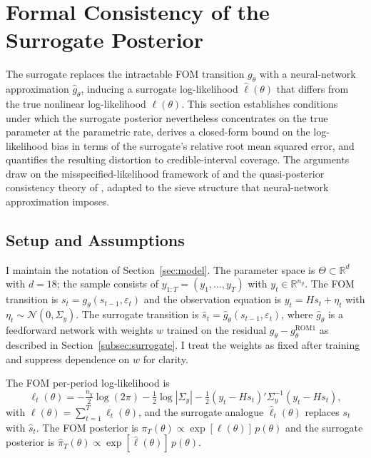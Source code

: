 \documentclass[12pt]{article}
\theoremstyle{plain}
\theoremstyle{definition}
\theoremstyle{remark}
\newcommand{\R}{\mathbb{R}}
\newcommand{\eps}{\varepsilon}
\newcommand{\Sigmay}{\Sigma_y}
\begin{document}
\section{Formal Consistency of the Surrogate Posterior}
\label{sec:formal_consistency}

The surrogate replaces the intractable FOM transition $g_\theta$ with a neural-network approximation $\hat{g}_\theta$, inducing a surrogate log-likelihood $\hat{\ell}(\theta)$ that differs from the true nonlinear log-likelihood $\ell(\theta)$. This section establishes conditions under which the surrogate posterior nevertheless concentrates on the true parameter at the parametric rate, derives a closed-form bound on the log-likelihood bias in terms of the surrogate's relative root mean squared error, and quantifies the resulting distortion to credible-interval coverage. The arguments draw on the misspecified-likelihood framework of \citet{kleijn2012bernstein} and the quasi-posterior consistency theory of \citet{mueller2013risk}, adapted to the sieve structure that neural-network approximation imposes.

\subsection{Setup and Assumptions}

I maintain the notation of Section~\ref{sec:model}. The parameter space is $\Theta \subset \R^d$ with $d = 18$; the sample consists of $y_{1:T} = (y_1, \ldots, y_T)$ with $y_t \in \R^{n_y}$. The FOM transition is $s_t = g_\theta(s_{t-1}, \eps_t)$ and the observation equation is $y_t = Hs_t + \eta_t$ with $\eta_t \sim \mathcal{N}(0,\Sigmay)$. The surrogate transition is $\hat{s}_t = \hat{g}_\theta(s_{t-1}, \eps_t)$, where $\hat{g}_\theta$ is a feedforward network with weights $w$ trained on the residual $g_\theta - g_\theta^{\text{ROM1}}$ as described in Section~\ref{subsec:surrogate}. I treat the weights as fixed after training and suppress dependence on $w$ for clarity.

The FOM per-period log-likelihood is
\[
\ell_t(\theta) = -\tfrac{n_y}{2}\log(2\pi) - \tfrac{1}{2}\log|\Sigmay|
  - \tfrac{1}{2}(y_t - Hs_t)'\Sigmay^{-1}(y_t - Hs_t),
\]
with $\ell(\theta) = \sum_{t=1}^T \ell_t(\theta)$, and the surrogate analogue $\hat{\ell}_t(\theta)$ replaces $s_t$ with $\hat{s}_t$. The FOM posterior is $\pi_T(\theta) \propto \exp[\ell(\theta)]\,p(\theta)$ and the surrogate posterior is $\hat{\pi}_T(\theta) \propto \exp[\hat{\ell}(\theta)]\,p(\theta)$.
\end{document}
